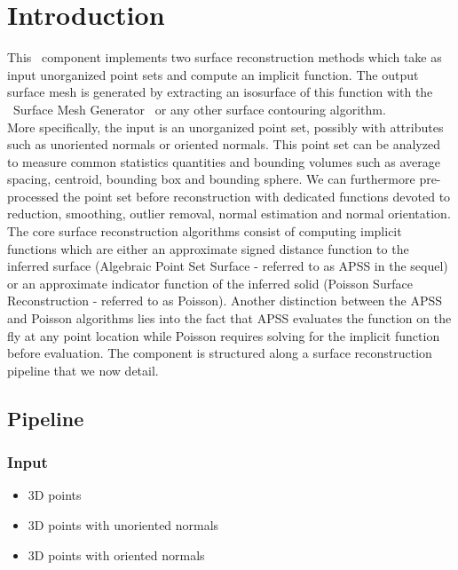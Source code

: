 \section{Introduction}

This \cgal\ component implements two surface reconstruction methods which take as input unorganized point sets and compute an implicit function. The output surface mesh is generated by extracting an isosurface of this function with the \cgal\ Surface Mesh Generator~\cite{cgal:ry-gsddrm-06} or any other surface contouring algorithm. \\

More specifically, the input is an unorganized point set, possibly with attributes such as unoriented normals or oriented normals. This point set can be analyzed to measure common statistics quantities and bounding volumes such as average spacing, centroid, bounding box and bounding sphere. We can furthermore pre-processed the point set before reconstruction with dedicated functions devoted to reduction, smoothing, outlier removal, normal estimation and normal orientation.\\

The core surface reconstruction algorithms consist of computing implicit functions which are either an approximate signed distance function to the inferred surface (Algebraic Point Set Surface - referred to as APSS in the sequel) or an approximate indicator function of the inferred solid (Poisson Surface Reconstruction - referred to as Poisson). Another distinction between the APSS and Poisson algorithms lies into the fact that APSS evaluates the function on the fly at any point location while Poisson requires solving for the implicit function before evaluation. The component is structured along a surface reconstruction pipeline that we now detail. 

\subsection{Pipeline}

\subsubsection{Input}

\begin{itemize}
\item 3D points
\item 3D points with unoriented normals
\item 3D points with oriented normals
\end{itemize}


